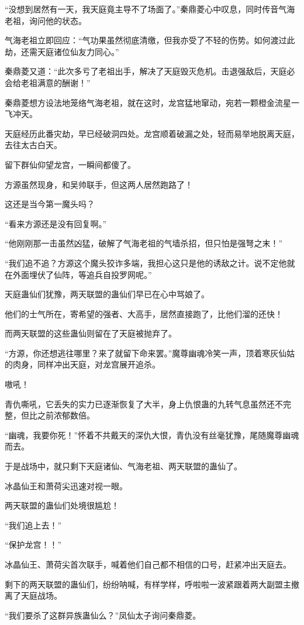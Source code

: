 \begin{this_body}
“没想到居然有一天，我天庭竟主导不了场面了。”秦鼎菱心中叹息，同时传音气海老祖，询问他的状态。

气海老祖立即回应：“气功果虽然彻底清缴，但我亦受了不轻的伤势。如何渡过此劫，还需天庭诸位仙友力同心。”

秦鼎菱又道：“此次多亏了老祖出手，解决了天庭毁灭危机。击退强敌后，天庭必会给老祖满意的酬谢！”

秦鼎菱想方设法地笼络气海老祖，就在这时，龙宫猛地窜动，宛若一颗橙金流星一飞冲天。

天庭经历此番灾劫，早已经破洞四处。龙宫顺着破漏之处，轻而易举地脱离天庭，去往太古白天。

留下群仙仰望龙宫，一瞬间都傻了。

方源虽然现身，和吴帅联手，但这两人居然跑路了！

这还是当今第一魔头吗？

“看来方源还是没有回复啊。”

“他刚刚那一击虽然凶猛，破解了气海老祖的气墙杀招，但只怕是强弩之末！”

“我们追不追？方源这个魔头狡诈多端，我担心这只是他的诱敌之计。说不定他就在外面埋伏了仙阵，等追兵自投罗网呢。”

天庭蛊仙们犹豫，两天联盟的蛊仙们早已在心中骂娘了。

他们的士气所在，寄希望的强者、大高手，居然直接跑了，比他们溜的还快！

而两天联盟的这些蛊仙则留在了天庭被抛弃了。

“方源，你还想逃往哪里？来了就留下命来罢。”魔尊幽魂冷笑一声，顶着寒灰仙姑的肉身，同样冲出天庭，对龙宫展开追杀。

嗷吼！

青仇嘶吼，它丢失的实力已逐渐恢复了大半，身上仇恨蛊的九转气息虽然还不完整，但比之前浓郁数倍。

“幽魂，我要你死！”怀着不共戴天的深仇大恨，青仇没有丝毫犹豫，尾随魔尊幽魂而去。

于是战场中，就只剩下天庭诸仙、气海老祖、两天联盟的蛊仙了。

冰晶仙王和萧荷尖迅速对视一眼。

两天联盟的蛊仙们处境很尴尬！

“我们追上去！”

“保护龙宫！！”

冰晶仙王、萧荷尖首次联手，喊着他们自己都不相信的口号，赶紧冲出天庭去。

剩下的两天联盟的蛊仙们，纷纷呐喊，有样学样，呼啦啦一波紧跟着两大副盟主撤离了天庭战场。

“我们要杀了这群异族蛊仙么？”凤仙太子询问秦鼎菱。


\end{this_body}
